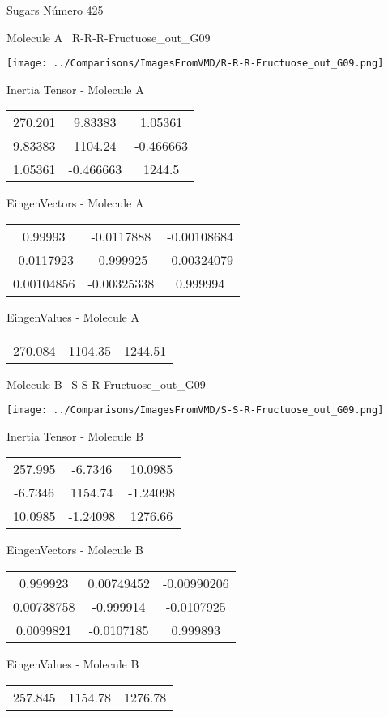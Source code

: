 \vtab[-3cm]
\begin{center}
{\large Sugars \tab Número 425}
\end{center}
\begin{multicols}{2}
\begin{center}

Molecule A \
R-R-R-Fructuose\_out\_G09

\texttt{[image: ../Comparisons/ImagesFromVMD/R-R-R-Fructuose\_out\_G09.png]}

Inertia Tensor - Molecule A \\
\begin{tabular}{|c c c|}
270.201	 & 	9.83383	 & 	1.05361	 \\
9.83383	 & 	1104.24	 & 	-0.466663	 \\
1.05361	 & 	-0.466663	 & 	1244.5
\end{tabular}

\vtab
 EingenVectors - Molecule A     \\
\begin{tabular}{|c c c|}
0.99993	 & 	-0.0117888	 & 	-0.00108684	 \\
-0.0117923	 & 	-0.999925	 & 	-0.00324079	 \\
0.00104856	 & 	-0.00325338	 & 	0.999994
\end{tabular}

\vtab
 EingenValues - Molecule A     \\
\begin{tabular}{|c c c|}
270.084	 & 	1104.35	 & 	1244.51	 \\
\end{tabular}
\columnbreak

Molecule B \
S-S-R-Fructuose\_out\_G09

\texttt{[image: ../Comparisons/ImagesFromVMD/S-S-R-Fructuose\_out\_G09.png]}

Inertia Tensor - Molecule B \\
\begin{tabular}{|c c c|}
257.995	 & 	-6.7346	 & 	10.0985	 \\
-6.7346	 & 	1154.74	 & 	-1.24098	 \\
10.0985	 & 	-1.24098	 & 	1276.66
\end{tabular}

\vtab
 EingenVectors - Molecule B     \\
\begin{tabular}{|c c c|}
0.999923	 & 	0.00749452	 & 	-0.00990206	 \\
0.00738758	 & 	-0.999914	 & 	-0.0107925	 \\
0.0099821	 & 	-0.0107185	 & 	0.999893
\end{tabular}

\vtab
 EingenValues - Molecule B     \\
\begin{tabular}{|c c c|}
257.845	 & 	1154.78	 & 	1276.78	 \\
\end{tabular}

\end{center}
\end{multicols}

